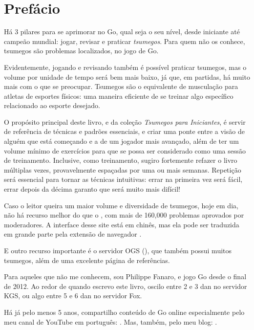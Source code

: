 \chapter{Prefácio}

\small
  
Há 3 pilares para se aprimorar no Go, qual seja o seu nível, desde iniciante até campeão mundial: jogar, revisar e praticar \emph{tsumegos}. Para quem não os conhece, tsumegos são problemas localizados, no jogo de Go.

Evidentemente, jogando e revisando também é possível praticar tsumegos, mas o volume por unidade de tempo será bem mais baixo, já que, em partidas, há muito mais com o que se preocupar. Tsumegos são o equivalente de musculação para atletas de esportes físicos: uma maneira eficiente de se treinar algo específico relacionado ao esporte desejado.

O propósito principal deste livro, e da coleção \emph{Tsumegos para Iniciantes}, é servir de referência de técnicas e padrões essenciais, e criar uma ponte entre a visão de alguém que está começando e a de um jogador mais avançado, além de ter um volume mínimo de exercícios para que se possa ser considerado como uma sessão de treinamento. Inclusive, como treinamento, sugiro fortemente refazer o livro múltiplas vezes, provavelmente espaçadas por uma ou mais semanas. Repetição será essencial para tornar as técnicas intuitivas: errar na primeira vez será fácil, errar depois da décima garanto que será muito mais difícil!

Caso o leitor queira um maior volume e diversidade de tsumegos, hoje em dia, não há recurso melhor do que o , com mais de 160,000 problemas aprovados por moderadores. A interface desse site está em chinês, mas ela pode ser traduzida em grande parte pela extensão de navegador \small{}.

E outro recurso importante é o servidor OGS (), que também possui muitos tsumegos, além de uma excelente página de referências.

\bigskip
\bigskip
\bigskip

Para aqueles que não me conhecem, sou Philippe Fanaro, e jogo Go desde o final de 2012. Ao redor de quando escrevo este livro, oscilo entre 2 e 3 dan no servidor KGS, ou algo entre 5 e 6 dan no servidor Fox.

Há já pelo menos 5 anos, compartilho conteúdo de Go online especialmente pelo meu canal de YouTube em português: . Mas, também, pelo meu blog: .

